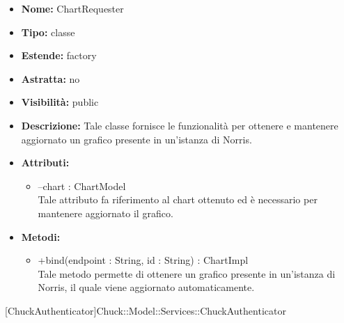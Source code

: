 			
			\begin{itemize}
			\item \textbf{Nome:} ChartRequester
			\item \textbf{Tipo:} classe
			
		\item \textbf{Estende:}
		factory
		\item \textbf{Astratta:}
		no
			\item \textbf{Visibilità:} public
			\item \textbf{Descrizione:} Tale classe fornisce le funzionalità per ottenere e mantenere aggiornato un grafico presente in un'istanza di Norris.
			\item \textbf{Attributi:}
				\begin{itemize}
				\setlength{\itemsep}{5pt}
				
					\item[\ding{111}] {--chart : ChartModel} \\ [1mm] Tale attributo fa riferimento al chart ottenuto ed è necessario per mantenere aggiornato il grafico.
				\end{itemize}
		
			\item \textbf{Metodi:}
				\begin{itemize}
				\setlength{\itemsep}{5pt}
				
					\item[\ding{111}] {{+bind(endpoint : String, id : String) : ChartImpl}} \\ [1mm] Tale metodo permette di ottenere un grafico presente in un'istanza di Norris, il quale viene aggiornato automaticamente.
				\end{itemize}
		
			\end{itemize}

			
			[ChuckAuthenticator]{Chuck::Model::Services::ChuckAuthenticator}
			

	
